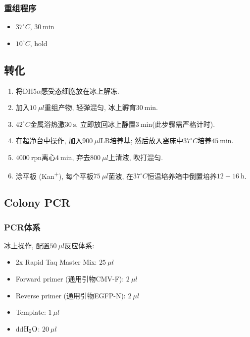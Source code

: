 \documentclass{article}
\begin{document}
\subsubsection{重组程序}

\begin{itemize}
    \item $37^\circ C$, $30\ \mbox{min}$
    \item $10^\circ C$, hold
\end{itemize}

\subsection{转化}

\begin{enumerate}
    \item 将DH5$\alpha$感受态细胞放在冰上解冻.
    \item 加入$10\ \mu l$重组产物, 轻弹混匀, 冰上孵育$30\ \mbox{min}$.
    \item $42^\circ C$金属浴热激$30\ \mbox{s}$, 立即放回冰上静置$3\ \mbox{min}$(此步骤需严格计时).
    \item 在超净台中操作, 加入$900\ \mu l$LB培养基; 然后放入窑床中$37^\circ C$培养$45\ \mbox{min}$.
    \item $4000\ \mbox{rpn}$离心$4\ \mbox{min}$, 弃去$800\ \mu l$上清液, 吹打混匀.
    \item 涂平板 (Kan\textsuperscript{+}), 每个平板$75\ \mu l$菌液, 在$37^\circ C$恒温培养箱中倒置培养$12-16\ \mbox{h}$.
\end{enumerate}

\subsection{Colony PCR}

\subsubsection{PCR体系}

冰上操作, 配置$50\ \mu l$反应体系:

\begin{itemize}
    \item 2x Rapid Taq Master Mix: $25\ \mu l$
    \item Forward primer (通用引物CMV-F): $2\ \mu l$
    \item Reverse primer (通用引物EGFP-N): $2\ \mu l$
    \item Template: $1\ \mu l$
    \item dd$\ce{H2O}$: $20\ \mu l$
\end{itemize} 
\end{document}
